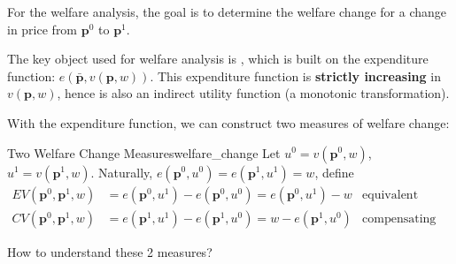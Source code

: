 For the welfare analysis, the goal is to determine the welfare change for a change in price from $\mathbf{p}^0$ to $\mathbf{p}^1$.

The key object used for welfare analysis is , which is built on the expenditure function: $e(\bar{\mathbf{p}},v(\mathbf{p},w))$. This expenditure function is \textbf{strictly increasing} in $v(\mathbf{p},w)$, hence is also an indirect utility function (a monotonic transformation).

With the expenditure function, we can construct two measures of welfare change:
\begin{definition}{Two Welfare Change Measures}{welfare_change}
    Let $u^0 = v(\mathbf{p}^0,w)$, $u^1 = v(\mathbf{p}^1,w)$. Naturally, $e(\mathbf{p}^0,u^0)=e(\mathbf{p}^1,u^1)=w$, define
    \begin{align*}
        EV(\mathbf{p}^0,\mathbf{p}^1,w) &=e(\mathbf{p}^0,u^1)-e(\mathbf{p}^0,u^0)=e(\mathbf{p}^0,u^1)-w & \text{equivalent variation}\\
        CV(\mathbf{p}^0,\mathbf{p}^1,w) &=e(\mathbf{p}^1,u^1)-e(\mathbf{p}^1,u^0)=w-e(\mathbf{p}^1,u^0) & \text{compensating variation}
    \end{align*}
\end{definition}

How to understand these 2 measures?